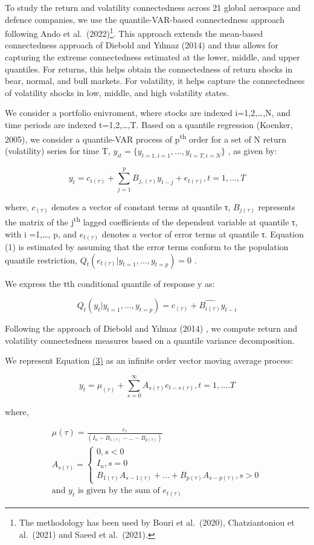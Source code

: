 \documentclass[
  letterpaper,
  DIV=11,
  numbers=noendperiod]{scrartcl}
\begin{document}
To study the return and volatility connectedness across 21 global
aerospace and defence companies, we use the quantile-VAR-based
connectedness approach following Ando et al.~(2022)\footnote{The
  methodology has been used by Bouri et al.~(2020), Chatziantoniou et
  al.~(2021) and Saeed et al.~(2021).}. This approach extends the
mean-based connectedness approach of Diebold and Yılmaz (2014) and thus
allows for capturing the extreme connectedness estimated at the lower,
middle, and upper quantiles. For returns, this helps obtain the
connectedness of return shocks in bear, normal, and bull markets. For
volatility, it helps capture the connectedness of volatility shocks in
low, middle, and high volatility states.

We consider a portfolio enivroment, where stocks are indexed
i=1,2,\ldots,N, and time periods are indexed t=1,2,\ldots,T. Based on a
quantile regression (Koenker, 2005), we consider a quantile-VAR process
of p\textsuperscript{th} order for a set of N return (volatility) series
for time T, \(y_{it}=\{y_{t=1,i=1},\dots,y_{t=T,i=N}\}\) , as given by:

\[
y_{t}=c_{i(\tau)}+\sum_{j=1}^{p} B_{j,(\tau)} y_{t-j}+e_{t(\tau)}, t=1,\dots,T
\]

where, \(c_{(\tau)}\) denotes a vector of constant terms at quantile τ,
\(B_{j(\tau)}\) represents the matrix of the j\textsuperscript{th}
lagged coefficients of the dependent variable at quantile τ, with i
=1,\ldots, p, and \(e_{t(\tau)}\) denotes a vector of error terms at
quantile τ. Equation (1) is estimated by assuming that the error terms
conform to the population quantile restriction,
\(Q_t(e_{t(\tau)} |y_{t=1},\dots,y_{t=p})=0\) .

We express the τth conditional quantile of response y as:

\[
Q_t(y_t |y_{t=1},\dots,y_{t=p})=c_{(\tau)}+\hat{B_{i(\tau)}} y_{t-i}
\]

Following the approach of Diebold and Yılmaz (2014) , we compute return
and volatility connectedness measures based on a quantile variance
decomposition.

We represent Equation
\href{https://www.sciencedirect.com/science/article/pii/S1062940819304085\#e0015}{(3)}
as an infinite order vector moving average process:

\[
y_t=\mu_{(\tau)}+\sum_{s=0}^{\infty}A_{s(\tau)}e_{t-s(\tau)}, t=1,\dots.T
\]

where,

\begin{align*}
\mu{(\tau)}= \frac{c_{\tau}}{\left (I_n-B_{1(\tau)}-\dots-B_{p(\tau)} \right)} \\
A_{s(\tau)}= \begin{cases} 0, s<0 \\ I_n, s=0 \\ B_{1(\tau)}A_{s-1(\tau)}+\dots+B_{p(\tau)}A_{s-p(\tau)}, s>0 \end{cases} \\
\text{and $y_t$ is given by the sum of $e_{t(\tau)}$}
\end{align*}
\end{document}
